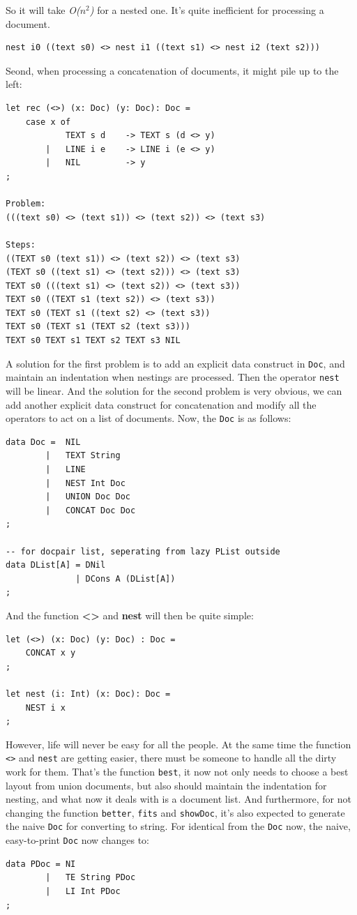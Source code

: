 So it will take \textit{O($n^2$)} for a nested one. It's quite inefficient for processing a document.
\begin{lstlisting}
nest i0 ((text s0) <> nest i1 ((text s1) <> nest i2 (text s2)))
\end{lstlisting}

Seond, when processing a concatenation of documents, it might pile up to the left:
\begin{lstlisting}
let rec (<>) (x: Doc) (y: Doc): Doc =
    case x of
            TEXT s d    -> TEXT s (d <> y)
        |   LINE i e    -> LINE i (e <> y)
        |   NIL         -> y
;

Problem:
(((text s0) <> (text s1)) <> (text s2)) <> (text s3)

Steps:
((TEXT s0 (text s1)) <> (text s2)) <> (text s3)
(TEXT s0 ((text s1) <> (text s2))) <> (text s3)
TEXT s0 (((text s1) <> (text s2)) <> (text s3))
TEXT s0 ((TEXT s1 (text s2)) <> (text s3))
TEXT s0 (TEXT s1 ((text s2) <> (text s3))
TEXT s0 (TEXT s1 (TEXT s2 (text s3)))
TEXT s0 TEXT s1 TEXT s2 TEXT s3 NIL
\end{lstlisting}

A solution for the first problem is to add an explicit data construct in \texttt{Doc}, and maintain an indentation when nestings are processed. Then the operator \texttt{nest} will be linear. And the solution for the second problem is very obvious, we can add another explicit data construct for concatenation and modify all
the operators to act on a list of documents. Now, the \texttt{Doc} is as follows:
\begin{lstlisting}
data Doc =  NIL
        |   TEXT String
        |   LINE
        |   NEST Int Doc
        |   UNION Doc Doc
        |   CONCAT Doc Doc
;

-- for docpair list, seperating from lazy PList outside
data DList[A] = DNil
              | DCons A (DList[A])
;
\end{lstlisting}

And the function \textbf{<>} and \textbf{nest} will then be quite simple:
\begin{lstlisting}
let (<>) (x: Doc) (y: Doc) : Doc =
    CONCAT x y
;

let nest (i: Int) (x: Doc): Doc =
    NEST i x
;
\end{lstlisting}

However, life will never be easy for all the people. At the same time the function \texttt{<>} and \texttt{nest} are getting easier, there must be someone to handle all the dirty work for them. That's the function \texttt{best}, it now not only needs to choose a best layout from union documents, but also should maintain the indentation for nesting, and what now it deals with is a document list. And furthermore, for not changing the function \texttt{better}, \texttt{fits} and \texttt{showDoc}, it's also expected to generate the naive \texttt{Doc} for converting to string. For identical from the \texttt{Doc} now, the naive, easy-to-print \texttt{Doc} now changes to:
\begin{lstlisting}
data PDoc = NI
        |   TE String PDoc
        |   LI Int PDoc
;
\end{lstlisting}


